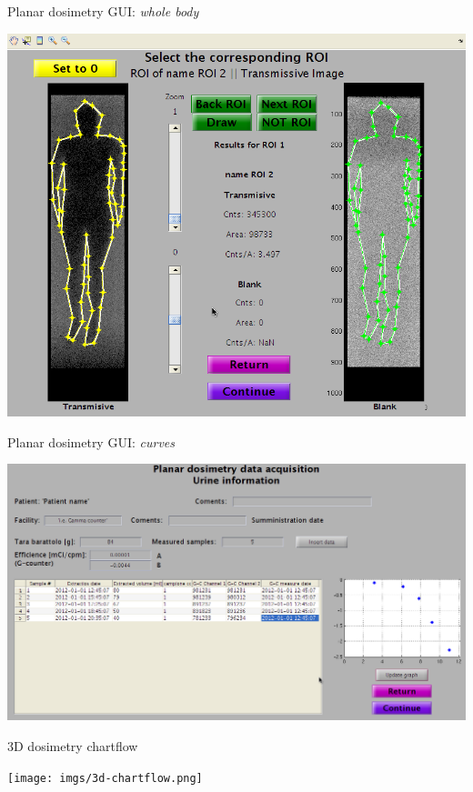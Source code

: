 \documentclass[ignorenonframetext,]{beamer}
\begin{document}
\begin{frame}{Planar dosimetry GUI: \emph{whole body}}
\protect\hypertarget{planar-dosimetry-gui-whole-body}{}

\begin{center}
\includegraphics[height=.8\textheight]{imgs/planar-wb.png}
\end{center}

\end{frame}

\begin{frame}{Planar dosimetry GUI: \emph{curves}}
\protect\hypertarget{planar-dosimetry-gui-curves}{}

\includegraphics{imgs/planar-curves.png}

\end{frame}

\begin{frame}{3D dosimetry chartflow}
\protect\hypertarget{d-dosimetry-chartflow}{}

\texttt{[image: imgs/3d-chartflow.png]}

\end{frame}
\end{document}
